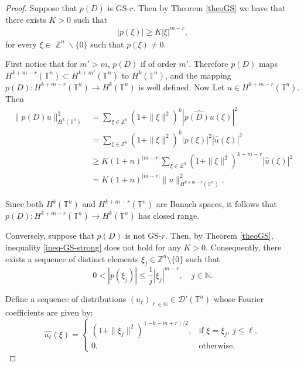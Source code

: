 \documentclass[10pt,a4paper]{amsart}
\DeclareMathOperator{\Z}{\mathbb{Z}}
\begin{document}
		\begin{proof}
		Suppose that $p(D)$ is GS-$r$. Then by Theorem \ref{theoGS} we have that there exists $K>0$ such that
		\begin{align}\label{ineq-GS-strong}
			|p(\xi)|\geq K|\xi|^{m-r},
		\end{align}
		for every $\xi\in\Z^n\backslash\{0\}$ such that $p(\xi)\neq 0$.
		
		First notice that for $m'>m$, $p(D)$ if of order $m'$. Therefore $p(D)$ maps $H^{k + m - r}(\mathbb{T}^n)\subset H^{k+m'}(\mathbb{T}^n)$ to $H^k(\mathbb{T}^n)$, and the mapping \(p(D): H^{k + m - r}(\mathbb{T}^n) \to H^k(\mathbb{T}^n)\) is well defined. Now Let $ u \in H^{k + m - r}(\mathbb{T}^n) $. Then 
		\begin{align*}
			\|p(D)u\|_{H^k(\mathbb{T}^n)}^2 &= \sum_{\xi \in \mathbb{Z}^n} (1 + \|\xi\|^2)^k \left| \widehat{p(D)u}(\xi) \right|^2 \\
			&= \sum_{\xi \in \mathbb{Z}^n} (1 + \|\xi\|^2)^k |p(\xi)|^2 |\widehat{u}(\xi)|^2 \\
			&\geq K(1+n)^{|m-r|} \sum_{\xi \in \mathbb{Z}^n} (1 + \|\xi\|^2)^{k + m - r} |\widehat{u}(\xi)|^2 \\
			&= K(1+n)^{|m-r|} \|u\|_{H^{k + m - r}(\mathbb{T}^n)}^2,
		\end{align*}
		
		Since both $ H^k(\mathbb{T}^n) $ and $ H^{k + m - r}(\mathbb{T}^n) $ are Banach spaces, it follows that $ p(D):H^{k + m - r}(\mathbb{T}^n)\to H^k(\mathbb{T}^n)$ has closed range. 
		
		
	Conversely, suppose that $ p(D) $ is not GS-$ r $. Then, by Theorem \ref{theoGS}, inequality \eqref{ineq-GS-strong} does not hold for any $ K > 0 $. Consequently, there exists a sequence of distinct elements $ \xi_j \in \mathbb{Z}^n \setminus \{0\} $ such that
	\begin{equation}\label{ineq_contradiction_closed}
		0 < |p(\xi_j)| \leq \frac{1}{j} |\xi_j|^{m - r}, \quad  j \in \mathbb{N}.
	\end{equation}
	
	Define a sequence of distributions $ (u_\ell)_{\ell \in \mathbb{N}} \in \mathscr{D}'(\mathbb{T}^n) $ whose Fourier coefficients are given by:
	\[
	\widehat{u_\ell}(\xi) =
	\begin{cases}
		(1 + \|\xi_j\|^2)^{(-k - m + r)/2}, & \text{if } \xi = \xi_j, \, j \leq \ell, \\
		0, & \text{otherwise.}
	\end{cases}
	\]
	

\end{proof}
\end{document}
